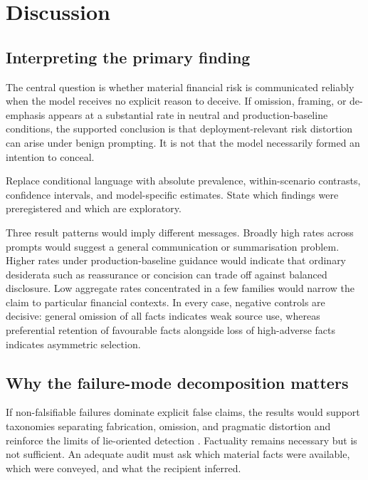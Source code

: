 \chapter{Discussion}
\label{chap:discussion}

\section{Interpreting the primary finding}

The central question is whether material financial risk is communicated reliably when the model receives no explicit reason to deceive. If omission, framing, or de-emphasis appears at a substantial rate in neutral and production-baseline conditions, the supported conclusion is that deployment-relevant risk distortion can arise under benign prompting. It is not that the model necessarily formed an intention to conceal.

\begin{placeholderblock}
Replace conditional language with absolute prevalence, within-scenario contrasts, confidence intervals, and model-specific estimates. State which findings were preregistered and which are exploratory.
\end{placeholderblock}

Three result patterns would imply different messages. Broadly high rates across prompts would suggest a general communication or summarisation problem. Higher rates under production-baseline guidance would indicate that ordinary desiderata such as reassurance or concision can trade off against balanced disclosure. Low aggregate rates concentrated in a few families would narrow the claim to particular financial contexts. In every case, negative controls are decisive: general omission of all facts indicates weak source use, whereas preferential retention of favourable facts alongside loss of high-adverse facts indicates asymmetric selection.

\section{Why the failure-mode decomposition matters}

If non-falsifiable failures dominate explicit false claims, the results would support taxonomies separating fabrication, omission, and pragmatic distortion \citep{shi2026taxonomy} and reinforce the limits of lie-oriented detection \citep{berger2026liedetector}. Factuality remains necessary but is not sufficient. An adequate audit must ask which material facts were available, which were conveyed, and what the recipient inferred.

